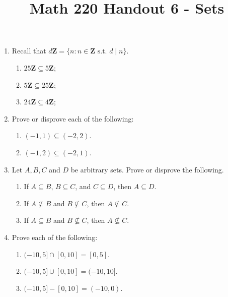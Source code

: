 \documentclass[12pt, reqno]{amsart}
\begin{document}
\title[Math 220 Handout 6 - Sets]{Math 220 Handout 6 - Sets}\maketitle

\begin{enumerate}
\item Recall that $d\mathbf{Z} = \{n : n \in \mathbf{Z} \text{ s.t. } d \mid n
 \}$.
 \begin{enumerate}
 \item $25\mathbf{Z} \subseteq 5 \mathbf{Z}$;
 \item $5\mathbf{Z} \subseteq 25\mathbf{Z}$;
 \item $24\mathbf{Z} \subseteq 4 \mathbf{Z}$; 

 \end{enumerate}
 \vspace{10pt}

\item Prove or disprove each of the following:
 \begin{enumerate}
 \item $(-1,1) \subseteq (-2,2)$. 
 \item $(-1,2) \subseteq (-2,1)$.
 \end{enumerate}
 \vspace{10pt} 

 
\item Let $A,B,C$ and $D$ be arbitrary sets. Prove or disprove the following.
 \begin{enumerate}
 \item If $A \subseteq B$, $B \subseteq C$, and $C \subseteq D$, then $A \subseteq D$.
 \item If $A \not \subseteq B$ and $B \not \subseteq C$, then $A \not \subseteq C$.
 \item If $A \subseteq B$ and $B \not \subseteq C$, then $A \not \subseteq C$.
 \end{enumerate}
\vspace{10pt}

\item Prove each of the following:
 \begin{enumerate}
 \item $(-10,5] \cap [0,10] = [0,5]$.
 \item $(-10,5] \cup [0,10] = (-10,10]$.
 \item $(-10,5] - [0,10] = (-10,0)$.
 \end{enumerate}


\end{enumerate}
\end{document}
